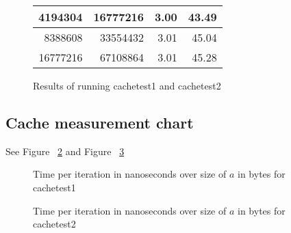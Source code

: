 \documentclass[10pt,a4paper]{article}
\begin{document}
\begin{figure}[h!]
\begin{center}
\begin{tabular}{|r|r|r|r|}
                \num[group-separator={,}]{    4194304    }    &    \num[group-separator={,}]{    16777216    }    & 3.00 & 43.49    \\ \hline
                \num[group-separator={,}]{    8388608    }    &    \num[group-separator={,}]{    33554432    }    & 3.01 & 45.04    \\ \hline
                \num[group-separator={,}]{    16777216    }    &    \num[group-separator={,}]{    67108864    }    & 3.01 & 45.28    \\ \hline
            \end{tabular}
        \end{center}
        \caption{Results of running cachetest1 and cachetest2}
        \label{cacheresults}
    \end{figure}

    \subsection{Cache measurement chart}
    See Figure ~\ref{cacheresultsone} and Figure ~\ref{cacheresultstwo}
    \begin{figure}[h!]
        \begin{center}
        \end{center}
        \caption{Time per iteration in nanoseconds over size of $a$ in bytes for cachetest1}
        \label{cacheresultsone}
    \end{figure}
    \begin{figure}[h!]
        \begin{center}
        \end{center}
        \caption{Time per iteration in nanoseconds over size of $a$ in bytes for cachetest2}
        \label{cacheresultstwo}
    \end{figure}
\end{document}
